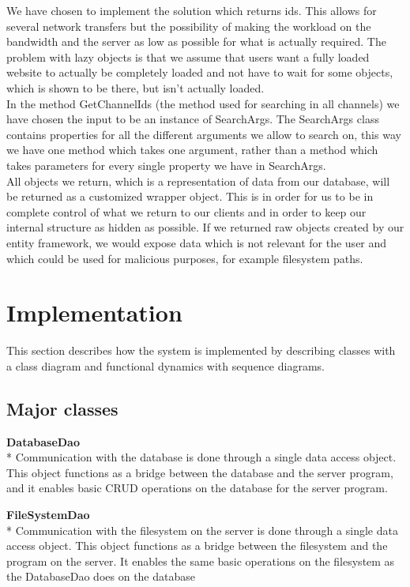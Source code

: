 \documentclass[a4paper,11pt,report]{article}
\begin{document}
We have chosen to implement the solution which returns ids. This allows for several network transfers but the possibility of making the workload on the bandwidth and the server as low as possible for what is actually required. The problem with lazy objects is that we assume that users want a fully loaded website to actually be completely loaded and not have to wait for some objects, which is shown to be there, but isn't actually loaded. \\
In the method GetChannelIds (the method used for searching in all channels) we have chosen the input to be an instance of SearchArgs. The SearchArgs class contains properties for all the different arguments we allow to search on, this way we have one method which takes one argument, rather than a method which takes parameters for every single property we have in SearchArgs. \\
All objects we return, which is a representation of data from our database, will be returned as a customized wrapper object. This is in order for us to be in complete control of what we return to our clients and in order to keep our internal structure as hidden as possible. If we returned raw objects created by our entity framework, we would expose data which is not relevant for the user and which could be used for malicious purposes, for example filesystem paths.

\section{Implementation}
This section describes how the system is implemented by describing classes with a class diagram and functional dynamics with sequence diagrams.

\subsection{Major classes}
\textbf{DatabaseDao} \\*
Communication with the database is done through a single data access object. This object functions as a bridge between the database and the server program, and it enables basic CRUD operations on the database for the server program. 

\textbf{FileSystemDao} \\*
Communication with the filesystem on the server is done through a single data access object. This object functions as a bridge between the filesystem and the program on the server. It enables the same basic operations on the filesystem as the DatabaseDao does on the database
\end{document}
